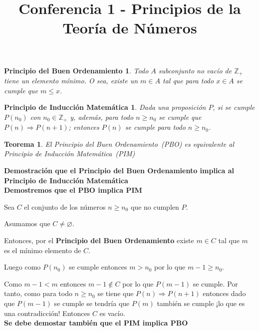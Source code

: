 \documentclass[a4paper,1pt]{report}
\title{Conferencia 1 - Principios de la Teoría de Números}
\author{}
\newtheorem*{pbo}{Principio del Buen Ordenamiento}
\newtheorem*{pim}{Principio de Inducción Matemática}
\newtheorem*{teo}{Teorema}
\begin{document}
\maketitle


\begin{pbo}

Todo $A$ subconjunto no vacío de $\mathbb{Z}_{+}$ tiene un elemento mínimo. O sea, existe un $m \in A$ tal que para todo $x \in A$ se cumple que $m \leq x$. 

\end{pbo}

\begin{pim}
 Dada una proposición $P$, si se cumple $P(n_0)$ con $n_0\in \mathbb{Z}_{+}$ y, además, para todo $n \geq n_0$ se cumple que $P(n) \Rightarrow P(n+1)$; entonces $P(n)$ se cumple para todo $n \geq n_0$.
\end{pim}

\begin{teo}
 El Principio del Buen Ordenamiento~(PBO) es equivalente al Principio de Inducción Matemática~(PIM)
\end{teo}

\textbf{Demostración que  el Principio del Buen Ordenamiento implica al Principio de Inducción Matemática}\\

\textbf{Demostremos que el PBO implica PIM}

Sea $C$ el conjunto de los números $n \geq n_0$ que no cumplen $P$. 

Asumamos que $C\neq \varnothing$. 

Entonces, por el \textbf{Principio del Buen Ordenamiento} existe $m\in C$ tal que $m$ es el mínimo elemento de $C$.

Luego como $P(n_0)$ se cumple entonces $m>n_0$ por lo que $m-1\geq n_0$.

Como $m-1<m$ entonces $m-1\notin C$ por lo que $P(m-1)$ se cumple. Por tanto, como para todo $n \geq n_0$ se tiene que $P(n)\Rightarrow P(n+1)$ entonces dado que $P(m-1)$ se cumple se tendría que $P(m)$ también se cumple ¡lo que es una contradicción! Entonces $C$ es vacío.\\

\textbf{Se debe demostar también que el PIM implica PBO}\\

\end{document}
